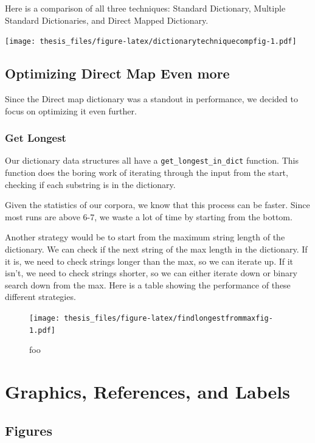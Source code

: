 \documentclass[12pt,twoside]{reedthesis}
\begin{document}
Here is a comparison of all three techniques: Standard Dictionary, Multiple Standard Dictionaries, and Direct Mapped Dictionary.

\texttt{[image: thesis\_files/figure-latex/dictionarytechniquecompfig-1.pdf]}

\hypertarget{optimizing-direct-map-even-more}{%
\section{Optimizing Direct Map Even more}\label{optimizing-direct-map-even-more}}

Since the Direct map dictionary was a standout in performance, we decided to focus on optimizing it even further.

\hypertarget{get-longest}{%
\subsection{Get Longest}\label{get-longest}}

Our dictionary data structures all have a \texttt{get\_longest\_in\_dict} function. This function does the boring work of iterating through the input from the start, checking if each substring is in the dictionary.

Given the statistics of our corpora, we know that this process can be faster. Since most runs are above 6-7, we waste a lot of time by starting from the bottom.

Another strategy would be to start from the maximum string length of the dictionary. We can check if the next string of the max length in the dictionary. If it is, we need to check strings longer than the max, so we can iterate up. If it isn't, we need to check strings shorter, so we can either iterate down or binary search down from the max. Here is a table showing the performance of these different strategies.
\begin{figure}
\centering
\texttt{[image: thesis\_files/figure-latex/findlongestfrommaxfig-1.pdf]}
\caption{\label{fig:findlongestfrommaxfig}foo}
\end{figure}
\hypertarget{ref-labels}{%
\chapter{Graphics, References, and Labels}\label{ref-labels}}

\hypertarget{figures}{%
\section{Figures}\label{figures}}
\end{document}
